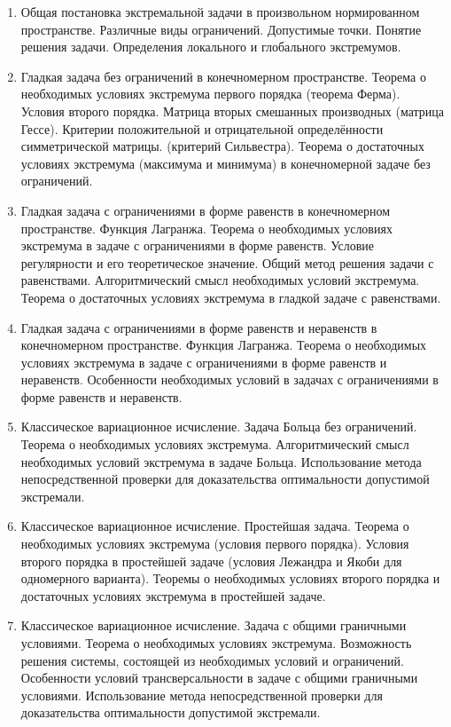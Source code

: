 % 
%

\begin{enumerate}
\item Общая  постановка  экстремальной  задачи  в  произвольном  нормированном  пространстве.  Различные  виды  ограничений.  Допустимые  точки.  Понятие  решения  задачи.  Определения  локального  и  глобального  экстремумов.

\item Гладкая  задача  без  ограничений  в  конечномерном   пространстве.  Теорема  о  необходимых  условиях  экстремума  первого  порядка (теорема  Ферма).  Условия  второго  порядка.  Матрица  вторых  смешанных  производных  (матрица  Гессе).  Критерии  положительной  и  отрицательной  определённости  симметрической  матрицы. (критерий  Сильвестра).  Теорема  о  достаточных  условиях  экстремума (максимума  и  минимума)  в  конечномерной  задаче  без  ограничений.

\item Гладкая  задача  с  ограничениями  в  форме  равенств  в  конечномерном  пространстве.  Функция  Лагранжа.  Теорема  о  необходимых  условиях  экстремума  в  задаче  с ограничениями  в  форме  равенств.  Условие  регулярности  и  его  теоретическое  значение.  Общий  метод  решения  задачи  с равенствами.  Алгоритмический  смысл  необходимых  условий  экстремума.  Теорема  о  достаточных  условиях  экстремума  в гладкой  задаче  с  равенствами.

\item Гладкая  задача  с  ограничениями  в  форме  равенств  и  неравенств  в  конечномерном  пространстве.  Функция  Лагранжа.  Теорема  о  необходимых  условиях  экстремума  в  задаче  с  ограничениями  в  форме  равенств  и  неравенств.  Особенности  необходимых  условий  в  задачах  с ограничениями  в  форме  равенств   и  неравенств.  

\item Классическое  вариационное  исчисление. Задача  Больца  без  ограничений.  Теорема  о необходимых  условиях  экстремума.  Алгоритмический  смысл  необходимых  условий  экстремума  в  задаче  Больца.  Использование  метода  непосредственной  проверки  для  доказательства  оптимальности  допустимой  экстремали.

\item Классическое  вариационное  исчисление.  Простейшая  задача.  Теорема  о необходимых  условиях  экстремума  (условия  первого  порядка).  Условия  второго порядка  в  простейшей  задаче  (условия  Лежандра  и  Якоби  для  одномерного  варианта).  Теоремы  о  необходимых  условиях  второго  порядка  и  достаточных  условиях  экстремума  в  простейшей  задаче.

\item Классическое  вариационное  исчисление.  Задача  с  общими  граничными  условиями.  Теорема о  необходимых  условиях  экстремума.  Возможность  решения  системы,  состоящей  из  необходимых  условий  и  ограничений.  Особенности  условий  трансверсальности  в  задаче  с  общими  граничными  условиями.  Использование  метода  непосредственной  проверки  для  доказательства  оптимальности  допустимой  экстремали.

\end{enumerate}



